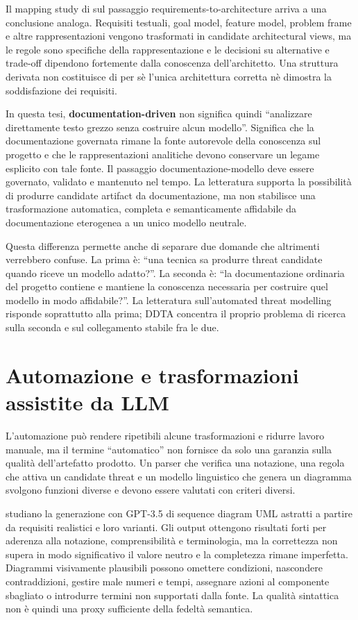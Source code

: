 \documentclass[12pt,a4paper,oneside]{report}
\begin{document}
Il mapping study di \citet{souza2019architecturalmodels} sul passaggio requirements-to-architecture arriva a una conclusione analoga. Requisiti testuali, goal model, feature model, problem frame e altre rappresentazioni vengono trasformati in candidate architectural views, ma le regole sono specifiche della rappresentazione e le decisioni su alternative e trade-off dipendono fortemente dalla conoscenza dell'architetto. Una struttura derivata non costituisce di per sè l'unica architettura corretta nè dimostra la soddisfazione dei requisiti.

In questa tesi, \textbf{documentation-driven} non significa quindi ``analizzare direttamente testo grezzo senza costruire alcun modello''. Significa che la documentazione governata rimane la fonte autorevole della conoscenza sul progetto e che le rappresentazioni analitiche devono conservare un legame esplicito con tale fonte. Il passaggio documentazione-modello deve essere governato, validato e mantenuto nel tempo. La letteratura supporta la possibilità di produrre candidate artifact da documentazione, ma non stabilisce una trasformazione automatica, completa e semanticamente affidabile da documentazione eterogenea a un unico modello neutrale.

Questa differenza permette anche di separare due domande che altrimenti verrebbero confuse. La prima è: ``una tecnica sa produrre threat candidate quando riceve un modello adatto?''. La seconda è: ``la documentazione ordinaria del progetto contiene e mantiene la conoscenza necessaria per costruire quel modello in modo affidabile?''. La letteratura sull'automated threat modelling risponde soprattutto alla prima; DDTA concentra il proprio problema di ricerca sulla seconda e sul collegamento stabile fra le due.

\section{Automazione e trasformazioni assistite da LLM}

L'automazione può rendere ripetibili alcune trasformazioni e ridurre lavoro manuale, ma il termine ``automatico'' non fornisce da solo una garanzia sulla qualità dell'artefatto prodotto. Un parser che verifica una notazione, una regola che attiva un candidate threat e un modello linguistico che genera un diagramma svolgono funzioni diverse e devono essere valutati con criteri diversi.

\citet{ferrari2024modelgeneration} studiano la generazione con GPT-3.5 di sequence diagram UML astratti a partire da requisiti realistici e loro varianti. Gli output ottengono risultati forti per aderenza alla notazione, comprensibilità e terminologia, ma la correttezza non supera in modo significativo il valore neutro e la completezza rimane imperfetta. Diagrammi visivamente plausibili possono omettere condizioni, nascondere contraddizioni, gestire male numeri e tempi, assegnare azioni al componente sbagliato o introdurre termini non supportati dalla fonte. La qualità sintattica non è quindi una proxy sufficiente della fedeltà semantica.
\end{document}
